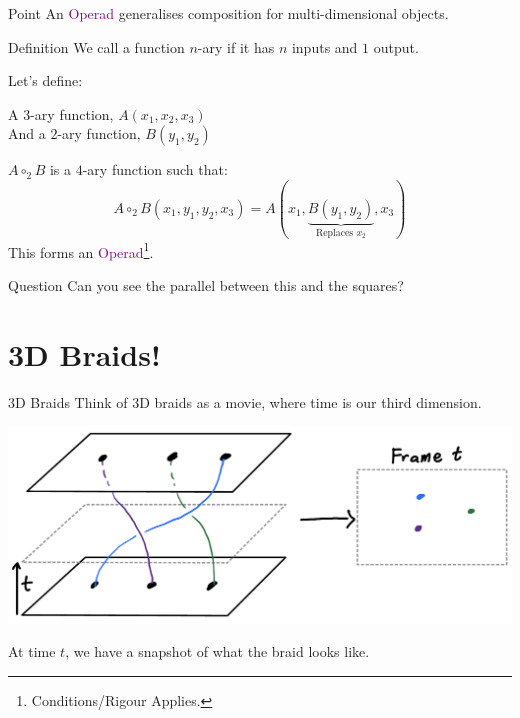 \documentclass[14pt, xcolor=svgnames]{beamer}
\newcommand{\Purple}[1]{\textcolor{Purple}{#1}}
\begin{document}
\begin{frame}
    \begin{block}{Point}
        An \Purple{Operad} generalises composition for multi-dimensional objects. 
    \end{block}
    \begin{block}{Definition}
        We call a function \( n \)-ary if it has \( n \) inputs and \( 1 \) output. 
    \end{block}
    Let's define: \\
    \begin{center}
        A \( 3 \)-ary function, \( A(x_1, x_2, x_3) \) \\ 
        And a \( 2 \)-ary function, \( B(y_1, y_2) \)
    \end{center}
\end{frame}

\begin{frame}
    \( A \circ_2 B \) is a \( 4 \)-ary function such that:
    \[ A \circ_2 B(x_1, y_1, y_2, x_3) = A(x_1, \underbrace{B(y_1, y_2)}_{\text{Replaces }x_2}, x_3) \]
    This forms an \Purple{Operad}\footnote{Conditions/Rigour Applies.}.
    \vfill
    \begin{block}{Question}
    Can you see the parallel between this and the squares?
    \end{block}
    \vfill
\end{frame}
    
\section{3D Braids!}
\begin{frame}{3D Braids}
    Think of 3D braids as a movie, where time is our third dimension. 
    \begin{center}
    \includegraphics[scale = 0.2]{images/movie representation of a braid.png}
    \end{center}

    At time \( t \), we have a snapshot of what the braid looks like.  
\end{frame}
\end{document}
